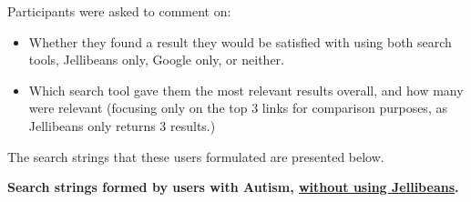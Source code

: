 \documentclass[a4paper, 11pt]{article}
\begin{document}
\vspace{5mm}
Participants were asked to comment on:
\begin{itemize}
\item{Whether they found a result they would be satisfied with using both search tools, Jellibeans only, Google only, or neither.}
\item{Which search tool gave them the most relevant results overall, and how many were relevant (focusing only on the top 3 links for comparison purposes, as Jellibeans only returns 3 results.)}
\end{itemize}

\vspace{5mm}
The search strings that these users formulated are presented below.


\textbf{Search strings formed by users with Autism, \underline{without using Jellibeans}. }
\end{document}
